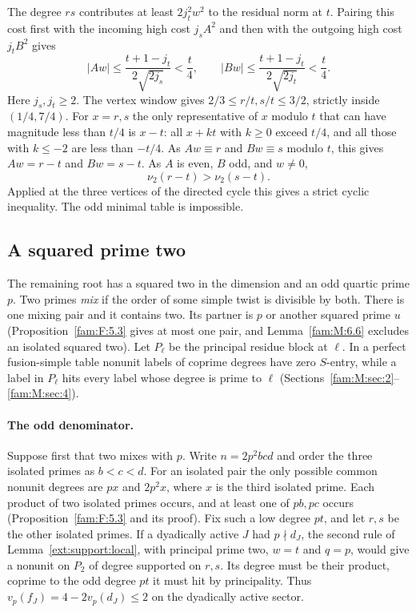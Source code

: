 \documentclass[11pt,a4paper]{article}
\numberwithin{equation}{section}
\theoremstyle{remark}
\begin{document}
The degree $rs$ contributes at least $2j_t^2w^2$ to the residual
norm at $t$. Pairing this cost first with the incoming high cost
$j_s A^2$ and then with the outgoing high cost $j_t B^2$ gives
\[
 |Aw|\le\frac{t+1-j_t}{2\sqrt{2j_s}}<\frac t4,
 \qquad
 |Bw|\le\frac{t+1-j_t}{2\sqrt{2j_t}}<\frac t4 .
\]
Here $j_s,j_t\ge2$. The vertex window gives
$2/3\le r/t,s/t\le3/2$, strictly inside $(1/4,7/4)$.
For $x=r,s$ the only representative of $x$ modulo $t$ that
can have magnitude less than $t/4$ is $x-t$: all $x+kt$
with $k\ge0$ exceed $t/4$, and all those with $k\le-2$ are
less than $-t/4$. As $Aw\equiv r$ and $Bw\equiv s$ modulo $t$,
this gives $Aw=r-t$ and $Bw=s-t$. As $A$ is even, $B$ odd, and $w\ne0$,
\[
                       \nu_2(r-t)>\nu_2(s-t).
\]
Applied at the three vertices of the directed cycle this gives a
strict cyclic inequality. The odd minimal table is impossible.

\subsection{A squared prime two}\label{fam:W:sec:4}
The remaining root has a squared two in the dimension and an odd
quartic prime $p$. Two primes \emph{mix} if the order of some
simple twist is divisible by both. There is one mixing pair and it
contains two. Its partner is $p$ or another squared prime $u$
(Proposition~\ref{fam:F:5.3} gives at most one pair, and Lemma~\ref{fam:M:6.6} excludes an isolated squared two). Let $P_\ell$ be the
principal residue block at $\ell$. In a perfect fusion-simple table
nonunit labels of coprime degrees have zero $S$-entry, while a label
in $P_\ell$ hits every label whose degree is prime to $\ell$
(Sections~\ref{fam:M:sec:2}--\ref{fam:M:sec:4}).

\paragraph{The odd denominator.} Suppose first that two mixes with $p$.
Write $n=2p^2bcd$ and order the three isolated primes as $b<c<d$.
For an isolated pair the only possible common nonunit degrees are $px$
and $2p^2x$, where $x$ is the third isolated prime. Each product of
two isolated primes occurs, and at least one of $pb,pc$ occurs
(Proposition~\ref{fam:F:5.3} and its proof). Fix such a low
degree $pt$, and let $r,s$ be the other isolated primes.
If a dyadically active $J$ had $p\nmid d_J$, the second rule of
Lemma~\ref{ext:support:local}, with principal prime two, $w=t$ and $q=p$,
would give a nonunit on $P_2$ of degree supported on $r,s$. Its degree must be their product, coprime
to the odd degree $pt$ it must hit by principality. Thus
$v_p(f_J)=4-2v_p(d_J)\le2$ on the dyadically active sector.
\end{document}
